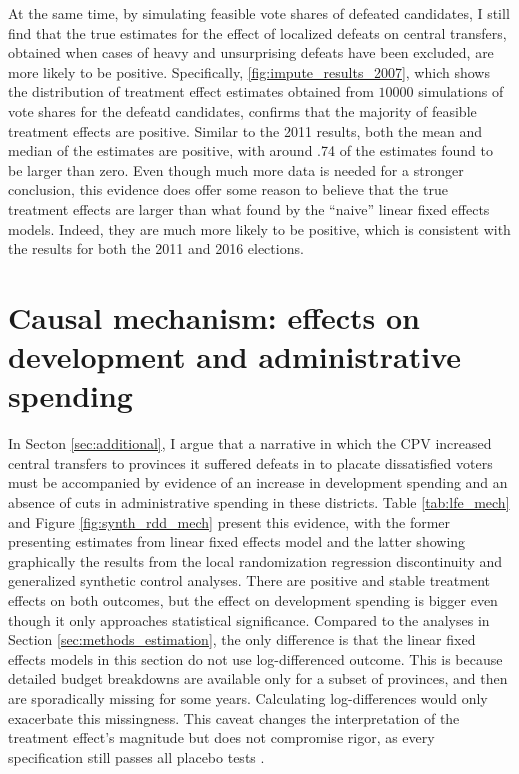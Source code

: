 \documentclass[12pt]{article}
\newcommand{\1}{\mathbbm{1}}
\begin{document}
At the same time, by simulating feasible vote shares of defeated candidates, I still find that the true estimates for the effect of localized defeats on central transfers, obtained when cases of heavy and unsurprising defeats have been excluded, are more likely to be positive. Specifically, \autoref{fig:impute_results_2007}, which shows the distribution of treatment effect estimates obtained from $10000$ simulations of vote shares for the defeatd candidates, confirms that the majority of feasible treatment effects are positive. Similar to the 2011 results, both the mean and median of the estimates are positive, with around .74 of the estimates found to be larger than zero. Even though much more data is needed for a stronger conclusion, this evidence does offer some reason to believe that the true treatment effects are larger than what found by the ``naive'' linear fixed effects models. Indeed, they are much more likely to be positive, which is consistent with the results for both the 2011 and 2016 elections.

\clearpage

\clearpage

\section{Causal mechanism: effects on development and administrative spending}
\label{app:mechanisms}

In Secton \ref{sec:additional}, I argue that a narrative in which the CPV increased central transfers to provinces it suffered defeats in to placate dissatisfied voters must be accompanied by evidence of an increase in development spending and an absence of cuts in administrative spending in these districts. Table \ref{tab:lfe_mech} and Figure \ref{fig:synth_rdd_mech} present this evidence, with the former presenting estimates from linear fixed effects model and the latter showing graphically the results from the local randomization regression discontinuity and generalized synthetic control analyses. There are positive and stable treatment effects on both outcomes, but the effect on development spending is bigger even though it only approaches statistical significance. Compared to the analyses in Section \ref{sec:methods_estimation}, the only difference is that the linear fixed effects models in this section do not use log-differenced outcome. This is because detailed budget breakdowns are available only for a subset of provinces, and then are sporadically missing for some years. Calculating log-differences would only exacerbate this missingness. This caveat changes the interpretation of the treatment effect's magnitude but does not compromise rigor, as every specification still passes all placebo tests .
\end{document}
